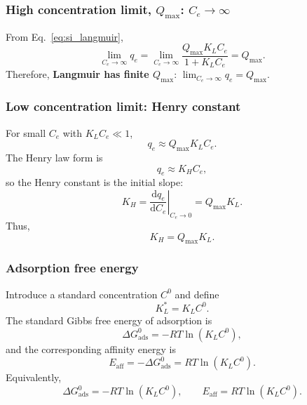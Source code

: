 \documentclass[journal=jacsat,manuscript=article]{achemso}
\begin{document}
\subsubsection{High concentration limit, \(Q_{\max}\): \(C_e \to \infty\)}

From Eq.~\eqref{eq:si_langmuir},
\begin{equation}
	\lim_{C_e \to \infty} q_e
	= \lim_{C_e \to \infty}
	\frac{Q_{\max} K_L C_e}{1 + K_L C_e}
	= Q_{\max}.
\end{equation}
Therefore,
\textbf{Langmuir has finite $Q_{\max}$}:\quad
$\displaystyle \lim_{C_e \to \infty} q_e = Q_{\max}$.%

\subsubsection{Low concentration limit: Henry constant}

For small \(C_e\) with \(K_L C_e \ll 1\),
\begin{equation}
	q_e \approx Q_{\max} K_L C_e.
\end{equation}
The Henry law form is
\begin{equation}
	q_e \approx K_H C_e,
	\label{eq:si_henry}
\end{equation}
so the Henry constant is the initial slope:
\begin{equation}
	K_H = \left.\frac{\mathrm{d}q_e}{\mathrm{d}C_e}\right|_{C_e \to 0}
	= Q_{\max} K_L.
\end{equation}
Thus,
\begin{equation}
	\boxed{K_H = Q_{\max} K_L.}
\end{equation}

\subsubsection{Adsorption free energy}

Introduce a standard concentration \(C^0\) and define
\begin{equation}
	K_L^{\ast} = K_L C^0.
\end{equation}
The standard Gibbs free energy of adsorption is
\begin{equation}
	\Delta G_{\mathrm{ads}}^{0}
	= - R T \ln\left( K_L C^0 \right),
\end{equation}
and the corresponding affinity energy is
\begin{equation}
	E_{\mathrm{aff}} = - \Delta G_{\mathrm{ads}}^{0}
	= R T \ln\left( K_L C^0 \right).
\end{equation}
Equivalently,
\begin{equation}
	\boxed{
		\Delta G_{\mathrm{ads}}^{0}
		= - R T \ln\left( K_L C^0 \right),
		\qquad
		E_{\mathrm{aff}} = R T \ln\left( K_L C^0 \right).
	}
\end{equation}
\end{document}
